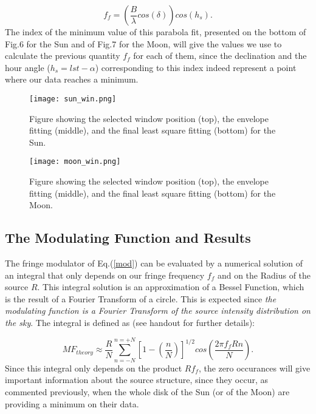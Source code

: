 \documentclass{article}
\begin{document}
\begin{equation}
f_{f} = \left(\frac{B}{\lambda}cos(\delta)\right)cos(h_{s}).
\label{f_f}
\end{equation} 
The index of the minimum value of this parabola fit, presented on the bottom
of Fig.6 for the Sun and of Fig.7 for the Moon, will give the values we use to calculate the
previous quantity $f_{f}$ for each of them, since the declination and the hour angle
($h_{s} = lst - \alpha$) corresponding to this index indeed represent
a point where our data reaches a minimum.

\begin{figure}[H]
\center
\texttt{[image: sun\_win.png]}
\caption {Figure showing the selected window position (top), the
  envelope fitting (middle), and the final least square fitting (bottom)
  for the Sun.} 
\label{sun_win}
\end{figure}

\begin{figure}[H]
\center
\texttt{[image: moon\_win.png]}
\caption {Figure showing the selected window position (top), the
  envelope fitting (middle), and the final least square fitting (bottom)
  for the Moon.} 
\label{moon_win}
\end{figure}

\subsection{The Modulating Function and Results} 

The fringe modulator of Eq.(\ref{mod}) can be evaluated by a numerical
solution of an integral
that only depends on our fringe frequency $f_{f}$ and on the Radius of
the source $R$. This integral solution is an approximation of a Bessel Function,
which is the result of a Fourier Transform of a circle. This is expected
since \emph{the modulating function is a Fourier Transform of the source intensity
distribution on the sky}. The integral is defined as (see handout for
further details): 

\begin{equation}
MF_{theory} \approx \frac{R}{N} \sum
_{n=-N}^{n=+N}\left[1-\left(\frac{n}{N}\right)\right]^{1/2}cos\left(\frac{2\pi
    f_{f}Rn}{N}\right).
\label{M_f}
\end{equation} 
Since this integral only depends on the product $Rf_{f}$, the zero
occurances will give important information about the source
structure, since they occur, as commented previously, when the whole
disk of the Sun (or of the Moon) are providing a minimum on their
data.  
\end{document}
